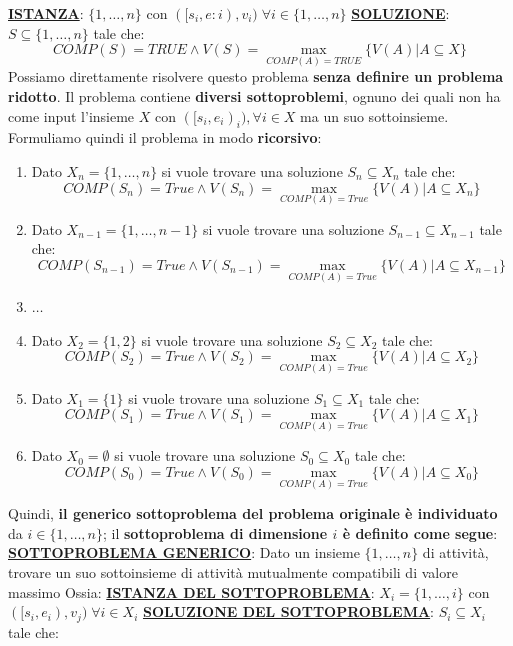 \documentclass[12pt]{article}
\begin{document}
\textbf{\underline{ISTANZA}}: $\{1,\dots,n\}$ con $([s_i, e:i), v_i) \; \forall i \in \{1,\dots,n\}$ \newline
\textbf{\underline{SOLUZIONE}}: $S \subseteq \{1,\dots,n\}$ tale che:
$$COMP(S) = TRUE \land V(S) = \max_{COMP(A) = TRUE}\{V(A)| A \subseteq X\}$$
Possiamo direttamente risolvere questo problema \textbf{senza definire un problema ridotto}.
Il problema contiene \textbf{diversi sottoproblemi}, ognuno dei quali non ha come input l'insieme $X$ con $([s_i, e_i) _i), \forall i \in X$ ma un suo sottoinsieme.
Formuliamo quindi il problema in modo \textbf{ricorsivo}:
\begin{enumerate}
    \item Dato $X_n = \{1,\dots,n\}$ si vuole trovare una soluzione $S_n \subseteq X_n$ tale che:
    $$COMP(S_n) = True \land V(S_n) = \max_{COMP(A) = True}\{V(A)|A \subseteq X_n\}$$
    \item Dato $X_{n-1} = \{1,\dots,n-1\}$ si vuole trovare una soluzione $S_{n-1} \subseteq X_{n-1}$ tale che:
    $$COMP(S_{n-1}) = True \land V(S_{n-1}) = \max_{COMP(A) = True}\{V(A)|A \subseteq X_{n-1}\}$$
    \item $\dots$
    \item Dato $X_2 = \{1,2\}$ si vuole trovare una soluzione $S_2 \subseteq X_2$ tale che:
    $$COMP(S_2) = True \land V(S_2) = \max_{COMP(A) = True}\{V(A)|A \subseteq X_2\}$$
    \item Dato $X_1 = \{1\}$ si vuole trovare una soluzione $S_1 \subseteq X_1$ tale che:
    $$COMP(S_1) = True \land V(S_1) = \max_{COMP(A) = True}\{V(A)|A \subseteq X_1\}$$
    \item Dato $X_0 = \emptyset$ si vuole trovare una soluzione $S_0 \subseteq X_0$ tale che:
    $$COMP(S_0) = True \land V(S_0) = \max_{COMP(A) = True}\{V(A)|A \subseteq X_0\}$$
\end{enumerate}
Quindi, \textbf{il generico sottoproblema del problema originale è individuato} da $i \in \{1,\dots, n\}$; il \textbf{sottoproblema di dimensione $i$ è definito come segue}: \newline
\textbf{\underline{SOTTOPROBLEMA GENERICO}}: Dato un insieme $\{1,\dots, n\}$ di attività, trovare un suo sottoinsieme di attività mutualmente compatibili di valore massimo \newline
Ossia: \newline
\textbf{\underline{ISTANZA DEL SOTTOPROBLEMA}}: $X_i = \{1,\dots, i\}$ con $([s_i, e_i), v_j) \; \forall i \in X_i$ \newline
\textbf{\underline{SOLUZIONE DEL SOTTOPROBLEMA}}: $S_i \subseteq X_i$ tale che:
\end{document}
